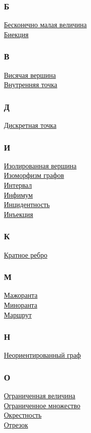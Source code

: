 \begin{multicols}{3}
\subsubsection*{Б} \noindent
\hyperlink{def:infinitesimal}{Бесконечно малая величина} \\
\hyperlink{def:bijection}{Биекция}
\subsubsection*{В} \noindent
\hyperlink{def:leaf_vertex}{Висячая вершина} \\
\hyperlink{def:interior_point}{Внутренняя точка}
\subsubsection*{Д} \noindent
\hyperlink{def:discrete_point}{Дискретная точка}
\subsubsection*{И} \noindent
\hyperlink{def:isolated_vertex}{Изолированная вершина} \\
\hyperlink{def:graph_isomorphism}{Изоморфизм графов} \\
\hyperlink{def:open_interval}{Интервал} \\
\hyperlink{def:infimum}{Инфимум} \\
\hyperlink{def:incidence}{Инцидентность} \\
\hyperlink{def:injection}{Инъекция}
\subsubsection*{К} \noindent
\hyperlink{def:multiple_edge}{Кратное ребро}
\subsubsection*{М} \noindent
\hyperlink{def:majorant}{Мажоранта} \\
\hyperlink{def:minorant}{Миноранта} \\
\hyperlink{def:walk}{Маршрут}
\subsubsection*{Н} \noindent
\hyperlink{def:undirected_graph}{Неориентированный граф}
\subsubsection*{О} \noindent
\hyperlink{def:bounded_quantity}{Ограниченная величина} \\
\hyperlink{def:bounded_set}{Ограниченное множество} \\
\hyperlink{def:neighbourhood}{Окрестность} \\
\hyperlink{def:closed_interval}{Отрезок}

\end{multicols}
